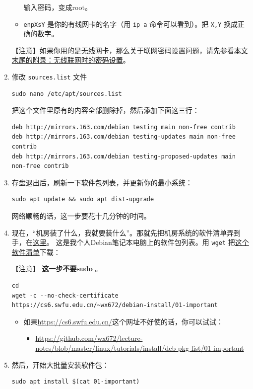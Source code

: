 \documentclass{wx672ctexart} \usepackage{hyperref}
\begin{document}
\begin{enumerate}
\begin{itemize}
输入密码，变成root。
\item \texttt{enpXsY} 是你的有线网卡的名字（用 \texttt{ip a} 命令可以看到）。把 \texttt{X,Y} 换成正确的数字。
\end{itemize}

【注意】如果你用的是无线网卡，那么关于联网密码设置问题，请先参看\hyperref[sec:orgf9afa95]{本文末尾的附录：无线联网时的密码设置}。

\item 修改 \texttt{sources.list} 文件
\begin{verbatim}
sudo nano /etc/apt/sources.list
\end{verbatim}

把这个文件里原有的内容全部删除掉，然后添加下面这三行：
\begin{verbatim}
deb http://mirrors.163.com/debian testing main non-free contrib
deb http://mirrors.163.com/debian testing-updates main non-free contrib
deb http://mirrors.163.com/debian testing-proposed-updates main non-free contrib
\end{verbatim}

\item 存盘退出后，刷新一下软件包列表，并更新你的最小系统：
\begin{verbatim}
sudo apt update && sudo apt dist-upgrade
\end{verbatim}


网络顺畅的话，这一步要花十几分钟的时间。
\item 现在，“机房装了什么，我就要装什么”。那就先把机房系统的软件清单弄到手，在\href{https://cs6.swfu.edu.cn/\~wx672/debian-install/list.laptop}{这里}。
这是我个人Debian笔记本电脑上的软件包列表。用 \texttt{wget} 把\href{https://gitlab.swfu.edu.cn/wx672/lecture\_notes/blob/master/linux/tutorials/install/deb-pkg-list/laptop}{这个软件清单}下载：

【注意】 \textbf{这一步不要sudo} 。
\begin{verbatim}
cd
wget -c --no-check-certificate https://cs6.swfu.edu.cn/~wx672/debian-install/01-important
\end{verbatim}


\begin{itemize}
\item 如果\url{https://cs6.swfu.edu.cn/}这个网址不好使的话，你可以试试：
\begin{itemize}
\item \url{https://github.com/wx672/lecture-notes/blob/master/linux/tutorials/install/deb-pkg-list/01-important}
\end{itemize}
\end{itemize}
\item 然后，开始大批量安装软件包：
\begin{verbatim}
sudo apt install $(cat 01-important)
\end{verbatim}



\end{enumerate}
\end{document}
